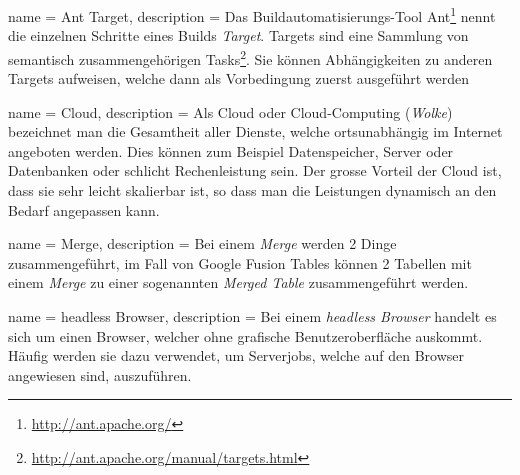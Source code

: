  {
	name = Ant Target,
	description = {Das Buildautomatisierungs-Tool Ant\footnote{\url{http://ant.apache.org/}} nennt die einzelnen Schritte eines Builds \emph{Target}. Targets sind eine Sammlung von semantisch zusammengehörigen Tasks\footnote{\url{http://ant.apache.org/manual/targets.html}}. Sie können Abhängigkeiten zu anderen Targets aufweisen, welche dann als Vorbedingung zuerst ausgeführt werden}
}

 {
	name = Cloud,
	description = {Als Cloud oder Cloud-Computing (\emph{Wolke}) bezeichnet man die Gesamtheit aller Dienste, welche ortsunabhängig im Internet angeboten werden. Dies können zum Beispiel Datenspeicher, Server oder Datenbanken oder schlicht Rechenleistung sein. Der grosse Vorteil der Cloud ist, dass sie sehr leicht skalierbar ist, so dass man  die Leistungen dynamisch an den Bedarf angepassen kann.\cite{cloud}}
}

 {
	name = Merge,
	description = {Bei einem \emph{Merge} werden 2 Dinge zusammengeführt, im Fall von Google Fusion Tables können 2 Tabellen mit einem \emph{Merge} zu einer sogenannten \emph{Merged Table} zusammengeführt werden.}
}

 {
	name = headless Browser,
	description = {Bei einem \emph{headless Browser} handelt es sich um einen Browser, welcher ohne grafische Benutzeroberfläche auskommt. Häufig werden sie dazu verwendet, um Serverjobs, welche auf den Browser angewiesen sind, auszuführen.}
}